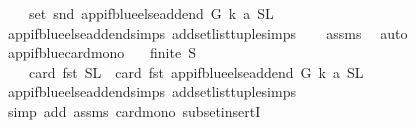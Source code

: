 \begin{isabellebody}
\ \ \ {\isasymsubseteq}\ set\ {\isacharparenleft}{\kern0pt}snd\ {\isacharparenleft}{\kern0pt}app{\isacharunderscore}{\kern0pt}if{\isacharunderscore}{\kern0pt}blue{\isacharunderscore}{\kern0pt}else{\isacharunderscore}{\kern0pt}add{\isacharunderscore}{\kern0pt}end\ G\ k\ a\ {\isacharparenleft}{\kern0pt}S{}{\isacharcomma}{\kern0pt}L{}{\isacharparenright}{\kern0pt}{\isacharparenright}{\kern0pt}{\isacharparenright}{\kern0pt}{\isachardoublequoteclose}\isanewline
%
\isadelimproof
\ \ %
\endisadelimproof
%
\isatagproof
{}\isamarkupfalse%
\ app{\isacharunderscore}{\kern0pt}if{\isacharunderscore}{\kern0pt}blue{\isacharunderscore}{\kern0pt}else{\isacharunderscore}{\kern0pt}add{\isacharunderscore}{\kern0pt}end{\isachardot}{\kern0pt}simps\ add{\isacharunderscore}{\kern0pt}set{\isacharunderscore}{\kern0pt}list{\isacharunderscore}{\kern0pt}tuple{\isachardot}{\kern0pt}simps\isanewline
\ \ \isamarkupfalse%
\ assms\ \isamarkupfalse%
\ auto%
\endisatagproof
{\isafoldproof}%
%
\isadelimproof
\isanewline
%
\endisadelimproof
\isanewline
\isanewline
{}\isamarkupfalse%
\ app{\isacharunderscore}{\kern0pt}if{\isacharunderscore}{\kern0pt}blue{\isacharunderscore}{\kern0pt}card{\isacharunderscore}{\kern0pt}mono{\isacharcolon}{\kern0pt}\isanewline
\ \ \ {\isachardoublequoteopen}finite\ S{\isachardoublequoteclose}\isanewline
\ \ \ \ {\isachardoublequoteopen}card\ {\isacharparenleft}{\kern0pt}fst\ {\isacharparenleft}{\kern0pt}S{\isacharcomma}{\kern0pt}L{\isacharparenright}{\kern0pt}{\isacharparenright}{\kern0pt}\ {\isasymle}\ card\ {\isacharparenleft}{\kern0pt}fst\ {\isacharparenleft}{\kern0pt}app{\isacharunderscore}{\kern0pt}if{\isacharunderscore}{\kern0pt}blue{\isacharunderscore}{\kern0pt}else{\isacharunderscore}{\kern0pt}add{\isacharunderscore}{\kern0pt}end\ G\ k\ a\ {\isacharparenleft}{\kern0pt}S{\isacharcomma}{\kern0pt}L{\isacharparenright}{\kern0pt}{\isacharparenright}{\kern0pt}{\isacharparenright}{\kern0pt}{\isachardoublequoteclose}\isanewline
%
\isadelimproof
\ \ %
\endisadelimproof
%
\isatagproof
{}\isamarkupfalse%
\ app{\isacharunderscore}{\kern0pt}if{\isacharunderscore}{\kern0pt}blue{\isacharunderscore}{\kern0pt}else{\isacharunderscore}{\kern0pt}add{\isacharunderscore}{\kern0pt}end{\isachardot}{\kern0pt}simps\ add{\isacharunderscore}{\kern0pt}set{\isacharunderscore}{\kern0pt}list{\isacharunderscore}{\kern0pt}tuple{\isachardot}{\kern0pt}simps\isanewline
\ \ \isamarkupfalse%
\ {\isacharparenleft}{\kern0pt}simp\ add{\isacharcolon}{\kern0pt}\ assms\ card{\isacharunderscore}{\kern0pt}mono\ subset{\isacharunderscore}{\kern0pt}insertI{\isacharparenright}{\kern0pt}%

\end{isabellebody}
